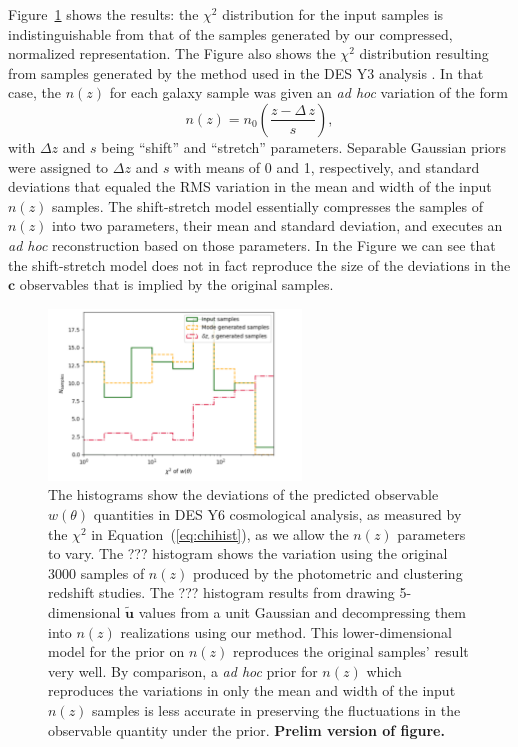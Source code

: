 \documentclass[linenumbers, onecolumn]{aastex63}
\newcommand{\eqq}[1]{Equation~(\ref{#1})}
\newcommand{\vecc}{\ensuremath{\mathbf{c}}}
\newcommand{\vecu}{\ensuremath{\mathbf{u}}}
\begin{document}
Figure~\ref{fig:chihist} shows the results: the $\chi^2$ distribution
for the input samples is indistinguishable from that of the samples
generated by our compressed, normalized representation.
The Figure also shows the $\chi^2$ distribution resulting from samples
generated by the method used in the DES Y3 analysis \citep{y3pz}.  In
that case, the $n(z)$ for each galaxy sample was given an \textit{ad
  hoc} variation of the form
\begin{equation}
  n(z) = n_0\left(\frac{z-\Delta\,z}{s}\right),
\end{equation}
with $\Delta z$ and $s$ being ``shift'' and ``stretch'' parameters.
Separable Gaussian priors were assigned to $\Delta z$ and $s$ with
means of 0 and 1, respectively, and standard deviations that equaled
the RMS variation in the mean and width of the input $n(z)$ samples.
The shift-stretch model essentially compresses the samples of $n(z)$
into two parameters, their mean and standard deviation, and executes
an \textit{ad hoc} reconstruction based on those parameters.
In the Figure we can see that the shift-stretch model does not in fact
reproduce the size of the deviations in the $\vecc$ observables that
is implied by the original samples.

\begin{figure}
  \center
  \includegraphics[width=0.6\textwidth]{chihist.pdf}
\caption{The histograms show the deviations of the predicted observable $w(\theta)$ quantities in
  DES Y6 cosmological analysis, as measured by the $\chi^2$ in
  \eqq{eq:chihist}, as we allow the $n(z)$ parameters to vary.  The
  ??? histogram shows the variation using the original 3000 samples of
  $n(z)$ produced by the photometric and clustering redshift studies.
  The ??? histogram results from
  drawing 5-dimensional $\widetilde{\vecu}$ values from a unit
  Gaussian and decompressing them into $n(z)$ realizations using our
  method.  This lower-dimensional model for the prior on $n(z)$
  reproduces the original samples' result very well.  By comparison,
  a \textit{ad hoc} prior for $n(z)$ which reproduces the variations in only the mean
  and width of the input $n(z)$ samples is less accurate in preserving
  the fluctuations in the observable quantity under the
  prior. \textbf{Prelim version of figure.} }
\label{fig:chihist}
\end{figure}
\end{document}
